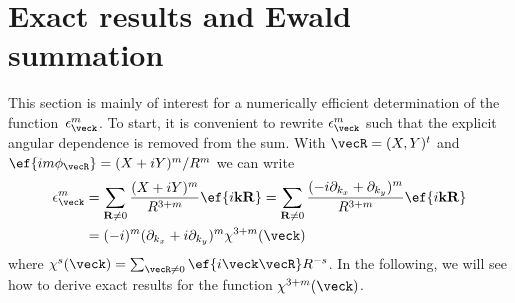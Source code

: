 %

\section{Exact results and Ewald summation}
This section is mainly of interest for a numerically efficient determination of the function~$\epskm$.
To start, it is convenient to rewrite $\epskm$ such that the explicit angular dependence is removed from the sum. With $\vecR = (X, Y)^t$ and $\ef{im\phi_\vecR} = (X+iY)^m/R^m$ we can write
\begin{align} \tlabel{epstochi}
    \epsilon^m_{\veck}
    &= \sum_{\vec{R}\ne 0} \frac{(X+i Y)^m}{R^{3+m}}\ef{i\vec{k}\vec{R}}
    = \sum_{\vec{R}\ne 0} \frac{(-i \partial_{k_x}+ \partial_{k_y})^m}{R^{3+m}} \ef{i\vec{k}\vec{R}} \\
    &= (-i)^m (\partial_{k_x}+ i \partial_{k_y})^m \chi^{3+m}(\veck)
\end{align}
where $\chi^s(\veck) = \sum_{\vecR\ne 0} \ef{i \veck \vecR} R^{-s}$.
In the following, we will see how to derive exact results for the function $\chi^{3+m}(\veck)$.

